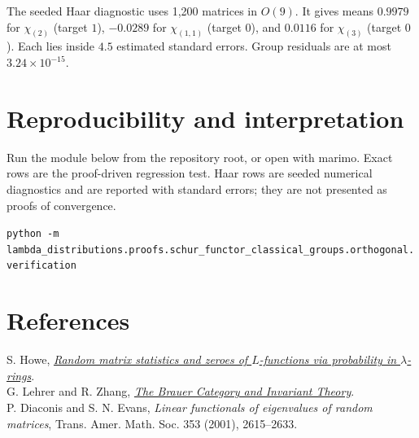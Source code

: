\documentclass[11pt]{article}
\begin{document}
The seeded Haar diagnostic uses 1,200 matrices in $O(9)$. It gives means $0.9979$ for $\chi_{(2)}$ (target $1$), $-0.0289$ for $\chi_{(1,1)}$ (target $0$), and $0.0116$ for $\chi_{(3)}$ (target $0$). Each lies inside $4.5$ estimated standard errors. Group residuals are at most $3.24\times10^{-15}$.

\section{Reproducibility and interpretation}
Run the module below from the repository root, or open  with marimo. Exact rows are the proof-driven regression test. Haar rows are seeded numerical diagnostics and are reported with standard errors; they are not presented as proofs of convergence.
\begin{center}\footnotesize\texttt{python -m lambda\_distributions.proofs.schur\_functor\_classical\_groups.orthogonal.verification}\end{center}

\section*{References}
S. Howe, \href{https://arxiv.org/abs/2412.19295}{\emph{Random matrix statistics and zeroes of $L$-functions via probability in $\lambda$-rings}}.\\
G. Lehrer and R. Zhang, \href{https://arxiv.org/abs/1207.5889}{\emph{The Brauer Category and Invariant Theory}}.
\\P. Diaconis and S. N. Evans, \emph{Linear functionals of eigenvalues of
random matrices}, Trans. Amer. Math. Soc. 353 (2001), 2615--2633.
\end{document}
